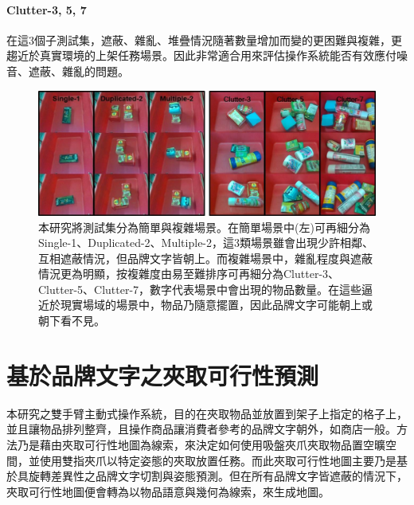 \paragraph{Clutter-3, 5, 7}
在這3個子測試集，遮蔽、雜亂、堆疊情況隨著數量增加而變的更困難與複雜，更趨近於真實環境的上架任務場景。因此非常適合用來評估操作系統能否有效應付噪音、遮蔽、雜亂的問題。


\begin{figure}[H]
	\centering
	\includegraphics[height=!, width=1.0\linewidth, keepaspectratio=true]
	{./figures/testset.jpg}
  \caption{本研究將測試集分為簡單與複雜場景。在簡單場景中(左)可再細分為Single-1、Duplicated-2、Multiple-2，這3類場景雖會出現少許相鄰、互相遮蔽情況，但品牌文字皆朝上。而複雜場景中，雜亂程度與遮蔽情況更為明顯，按複雜度由易至難排序可再細分為Clutter-3、Clutter-5、Clutter-7，數字代表場景中會出現的物品數量。在這些逼近於現實場域的場景中，物品乃隨意擺置，因此品牌文字可能朝上或朝下看不見。}
  \label{figure:testset}
\end{figure}


\section{基於品牌文字之夾取可行性預測}\label{sec:affordance_pr}
本研究之雙手臂主動式操作系統，目的在夾取物品並放置到架子上指定的格子上，並且讓物品排列整齊，且操作商品讓消費者參考的品牌文字朝外，如商店一般。方法乃是藉由夾取可行性地圖為線索，來決定如何使用吸盤夾爪夾取物品置空曠空間，並使用雙指夾爪以特定姿態的夾取放置任務。而此夾取可行性地圖主要乃是基於具旋轉差異性之品牌文字切割與姿態預測。但在所有品牌文字皆遮蔽的情況下，夾取可行性地圖便會轉為以物品語意與幾何為線索，來生成地圖。

